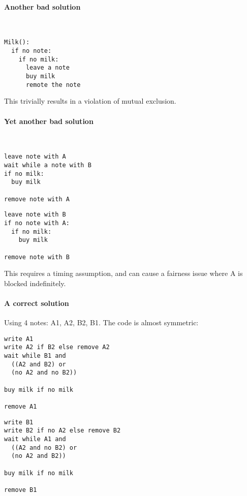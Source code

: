 \documentclass[a4paper]{article}
\begin{document}
\paragraph{Another bad solution}\ \\

\begin{lstlisting}[frame=L]
Milk():
  if no note:
    if no milk:
      leave a note
      buy milk
      remote the note
\end{lstlisting}

This trivially results in a violation of mutual exclusion.

\paragraph{Yet another bad solution}\ \\

\noindent\begin{minipage}{.45\textwidth}
\begin{lstlisting}[frame=L]
leave note with A
wait while a note with B
if no milk:
  buy milk

remove note with A
\end{lstlisting}
\end{minipage}\hfill
\begin{minipage}{.45\textwidth}
\begin{lstlisting}[frame=L]
leave note with B
if no note with A:
  if no milk:
    buy milk

remove note with B
\end{lstlisting}
\end{minipage}

This requires a timing assumption, and can cause a fairness issue where A is blocked indefinitely.

\paragraph{A correct solution}

Using 4 notes: A1, A2, B2, B1. The code is almost symmetric:

\noindent\begin{minipage}{.45\textwidth}
\begin{lstlisting}[frame=L]
write A1
write A2 if B2 else remove A2
wait while B1 and
  ((A2 and B2) or
  (no A2 and no B2))

buy milk if no milk

remove A1
\end{lstlisting}
\end{minipage}\hfill
\begin{minipage}{.45\textwidth}
\begin{lstlisting}[frame=L]
write B1
write B2 if no A2 else remove B2
wait while A1 and
  ((A2 and no B2) or
  (no A2 and B2))

buy milk if no milk

remove B1
\end{lstlisting}
\end{minipage}
\end{document}
